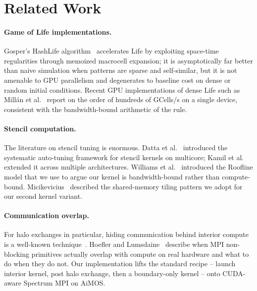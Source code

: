 \documentclass[sigconf,nonacm,10pt]{acmart}
\begin{document}
\section{Related Work}\label{sec:related}

\paragraph{Game of Life implementations.}
Gosper's HashLife algorithm~\cite{gosper1984hashlife} accelerates Life
by exploiting space-time regularities through memoized macrocell
expansion; it is asymptotically far better than naive simulation when
patterns are sparse and self-similar, but it is not amenable to GPU
parallelism and degenerates to baseline cost on dense or random initial
conditions. Recent GPU implementations of dense Life such as
Mill\'an et al.~\cite{millan2018gol} report on the order of hundreds of
GCells/s on a single device, consistent with the bandwidth-bound
arithmetic of the rule.

\paragraph{Stencil computation.}
The literature on stencil tuning is enormous. Datta et
al.~\cite{datta2008stencil} introduced the systematic auto-tuning
framework for stencil kernels on multicore; Kamil et
al.~\cite{kamil2010autotune} extended it across multiple architectures.
Williams et al.~\cite{williams2009roofline} introduced the Roofline
model that we use to argue our kernel is bandwidth-bound rather than
compute-bound. Micikevicius~\cite{micikevicius20093d} described the
shared-memory tiling pattern we adopt for our second kernel variant.

\paragraph{Communication overlap.}
For halo exchanges in particular, hiding communication behind interior
compute is a well-known technique~\cite{shimokawabe2011peta,gysi2015modesto}.
Hoefler and Lumsdaine~\cite{hoefler2010overlap} describe when MPI
non-blocking primitives actually overlap with compute on real hardware
and what to do when they do not. Our implementation lifts the standard
recipe -- launch interior kernel, post halo exchange, then a
boundary-only kernel -- onto CUDA-aware Spectrum MPI on AiMOS.
\end{document}
